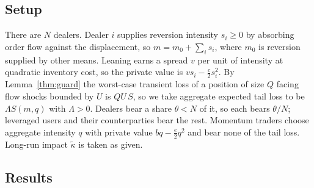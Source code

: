 \documentclass[12pt]{article}
\theoremstyle{definition}
\theoremstyle{remark}
\begin{document}
\subsection{Setup}
There are $N$ dealers. Dealer $i$ supplies reversion intensity $s_i\ge0$ by absorbing order flow against the displacement, so $m=m_0+\sum_is_i$, where $m_0$ is reversion supplied by other means. Leaning earns a spread $v$ per unit of intensity at quadratic inventory cost, so the private value is $vs_i-\tfrac c2s_i^2$. By Lemma~\ref{thm:guard} the worst-case transient loss of a position of size $Q$ facing flow shocks bounded by $U$ is $QU\,S$, so we take aggregate expected tail loss to be $\Lambda S(m,q)$ with $\Lambda>0$. Dealers bear a share $\theta<N$ of it, so each bears $\theta/N$; leveraged users and their counterparties bear the rest. Momentum traders choose aggregate intensity $q$ with private value $bq-\tfrac e2q^2$ and bear none of the tail loss. Long-run impact $\tilde\kappa$ is taken as given.

\subsection{Results}
\end{document}
